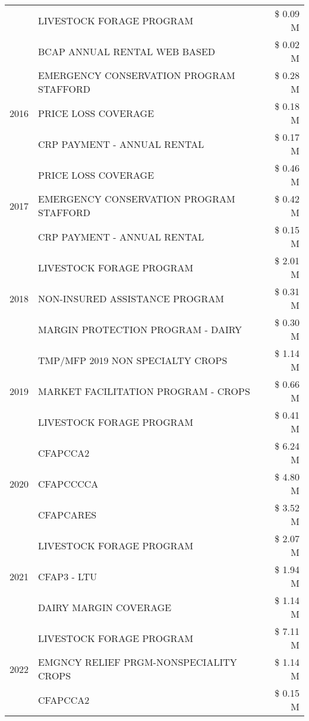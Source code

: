 \begin{tabular}{llr}
 & LIVESTOCK FORAGE PROGRAM & \$ 0.09 M \\
 & BCAP ANNUAL RENTAL WEB BASED & \$ 0.02 M \\
\cline{1-3}
\multirow[t]{3}{*}{2016} & EMERGENCY CONSERVATION PROGRAM STAFFORD & \$ 0.28 M \\
 & PRICE LOSS COVERAGE & \$ 0.18 M \\
 & CRP PAYMENT - ANNUAL RENTAL & \$ 0.17 M \\
\cline{1-3}
\multirow[t]{3}{*}{2017} & PRICE LOSS COVERAGE & \$ 0.46 M \\
 & EMERGENCY CONSERVATION PROGRAM STAFFORD & \$ 0.42 M \\
 & CRP PAYMENT - ANNUAL RENTAL & \$ 0.15 M \\
\cline{1-3}
\multirow[t]{3}{*}{2018} & LIVESTOCK FORAGE PROGRAM & \$ 2.01 M \\
 & NON-INSURED ASSISTANCE PROGRAM & \$ 0.31 M \\
 & MARGIN PROTECTION PROGRAM - DAIRY & \$ 0.30 M \\
\cline{1-3}
\multirow[t]{3}{*}{2019} & TMP/MFP 2019 NON SPECIALTY CROPS & \$ 1.14 M \\
 & MARKET FACILITATION PROGRAM - CROPS & \$ 0.66 M \\
 & LIVESTOCK FORAGE PROGRAM & \$ 0.41 M \\
\cline{1-3}
\multirow[t]{3}{*}{2020} & CFAPCCA2 & \$ 6.24 M \\
 & CFAPCCCCA & \$ 4.80 M \\
 & CFAPCARES & \$ 3.52 M \\
\cline{1-3}
\multirow[t]{3}{*}{2021} & LIVESTOCK FORAGE PROGRAM & \$ 2.07 M \\
 & CFAP3 - LTU & \$ 1.94 M \\
 & DAIRY MARGIN COVERAGE & \$ 1.14 M \\
\cline{1-3}
\multirow[t]{3}{*}{2022} & LIVESTOCK FORAGE PROGRAM & \$ 7.11 M \\
 & EMGNCY RELIEF PRGM-NONSPECIALITY CROPS & \$ 1.14 M \\
 & CFAPCCA2 & \$ 0.15 M \\
\cline{1-3}
\bottomrule
\end{tabular}
